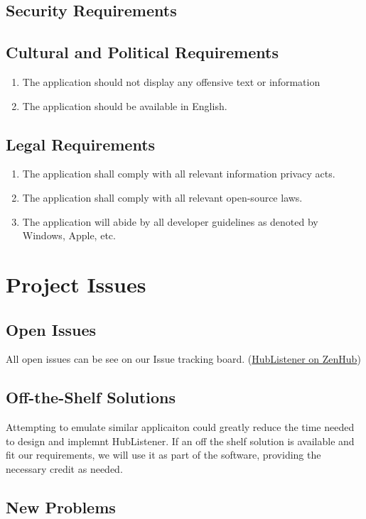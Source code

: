 \documentclass{article}
\begin{document}
\subsection{Security Requirements}
\subsection{Cultural and Political Requirements}
\begin{enumerate}
\item The application should not display any offensive text or information 
\item The application should be available in English. 
\end{enumerate}
\subsection{Legal Requirements}
\begin{enumerate}
\item The application shall comply with all relevant information privacy acts.
\item The application shall comply with all relevant open-source laws. 
\item The application will abide by all developer guidelines as denoted by Windows, Apple, etc. 
\end{enumerate}

\newpage
\section{Project Issues }
\subsection{Open Issues}
All open issues can be see on our Issue tracking board. (\href{ https://app.zenhub.com/workspaces/hublistener-5bad6c4d4b5806bc2bea488f/boards?repos=150634456}{HubListener on ZenHub})
\subsection{Off-the-Shelf Solutions}
Attempting to emulate similar applicaiton could greatly reduce the time needed to design and implemnt HubListener. If an off the shelf solution is available and fit our requirements, we will use it as part of the software, providing the necessary credit as needed. 
\subsection{New Problems}
\end{document}
